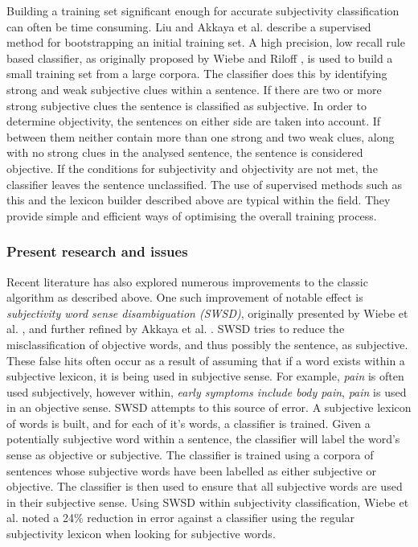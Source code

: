 Building a training set significant enough for accurate subjectivity classification can often be time consuming. Liu \cite{Liu:2010tm} and Akkaya et al. \cite{Akkaya:2009ww} describe a supervised method for bootstrapping an initial training set. A high precision, low recall rule based classifier, as originally proposed by Wiebe and Riloff \cite{Wiebe:2003wa}, is used to build a small training set from a large corpora. The classifier does this by identifying strong and weak subjective clues within a sentence. If there are two or more strong subjective clues the sentence is classified as subjective. In order to determine objectivity, the sentences on either side are taken into account. If between them neither contain more than one strong and two weak clues, along with no strong clues in the analysed sentence, the sentence is considered objective. If the conditions for subjectivity and objectivity are not met, the classifier leaves the sentence unclassified. The use of supervised methods such as this and the lexicon builder described above are typical within the field. They provide simple and efficient ways of optimising the overall training process.

\subsubsection{Present research and issues}

Recent literature has also explored numerous improvements to the classic algorithm as described above. One such improvement of notable effect is \emph{subjectivity word sense disambiguation (SWSD)}, originally presented by Wiebe et al. \cite{Wiebe:2006te}, and further refined by Akkaya et al. \cite{Akkaya:2009ww}. SWSD tries to reduce the misclassification of objective words, and thus possibly the sentence, as subjective. These false hits often occur as a result of assuming that if a word exists within a subjective lexicon, it is being used in subjective sense. For example, \emph{pain} is often used subjectively, however within, \emph{early symptoms include body pain}, \emph{pain} is used in an objective sense. SWSD attempts to this source of error. A subjective lexicon of words is built, and for each of it's words, a classifier is trained. Given a potentially subjective word within a sentence, the classifier will label the word's sense as objective or subjective. The classifier is trained using a corpora of sentences whose subjective words have been labelled as either subjective or objective. The classifier is then used to ensure that all subjective words are used in their subjective sense. Using SWSD within subjectivity classification, Wiebe et al. \cite{Akkaya:2009ww} noted a 24\% reduction in error against a classifier using the regular subjectivity lexicon when looking for subjective words. 

